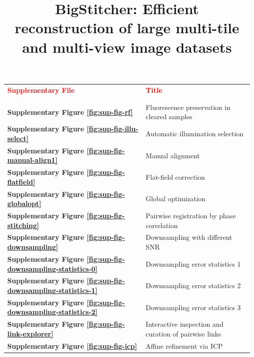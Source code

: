 \documentclass[]{spie}  %
\title{BigStitcher: Efficient reconstruction of large multi-tile and multi-view image datasets}
\author{%
}
\newcommand\tablespace{\vspace{2.5mm}}
\begin{document}
\maketitle

\setcounter{page}{1}


\hspace{20mm}

\begin{table}[h!]
\center
{
\fontsize{12pt}{11pt}\selectfont
\center
\begin{tabular}{lp{11cm}}
\textbf{\textcolor{red}{Supplementary File}} & \textbf{\textcolor{red}{Title}}\\ \\
\hline
\\
\textbf{Supplementary Figure \ref{fig:sup-fig-rf}} & Fluorescence preservation in cleared samples\tablespace \\
\textbf{Supplementary Figure \ref{fig:sup-fig-illu-select}} & Automatic illumination selection \tablespace \\
\textbf{Supplementary Figure \ref{fig:sup-fig-manual-align1}} &  Manual alignment \tablespace \\
\textbf{Supplementary Figure \ref{fig:sup-fig-flatfield}} & Flat-field correction \tablespace \\
\textbf{Supplementary Figure \ref{fig:sup-fig-globalopt}} & Global optimization \tablespace \\
\textbf{Supplementary Figure \ref{fig:sup-fig-stitching}} & Pairwise registration by phase correlation \tablespace \\
\textbf{Supplementary Figure \ref{fig:sup-fig-downsampling}} & Downsampling with different SNR \tablespace \\
\textbf{Supplementary Figure \ref{fig:sup-fig-downsampling-statistics-0}} & Downsampling error statistics 1 \tablespace \\
\textbf{Supplementary Figure \ref{fig:sup-fig-downsampling-statistics-1}} & Downsampling error statistics 2 \tablespace \\
\textbf{Supplementary Figure \ref{fig:sup-fig-downsampling-statistics-2}} & Downsampling error statistics 3 \tablespace \\
\textbf{Supplementary Figure \ref{fig:sup-fig-link-explorer}} & Interactive inspection and curation of pairwise links \tablespace \\
\textbf{Supplementary Figure \ref{fig:sup-fig-icp}} & Affine refinement via ICP \tablespace \\

\end{tabular}}
\end{table}
\end{document}
